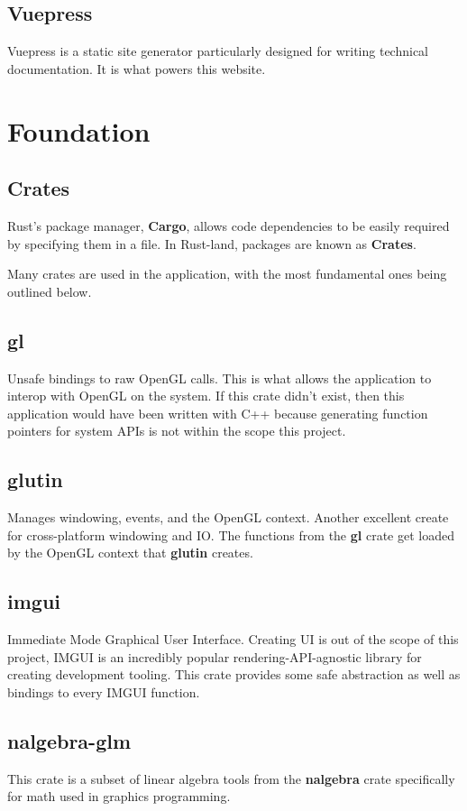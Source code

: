 \begin{multicols}{2}
  \subsection{Vuepress}
  Vuepress is a static site generator particularly designed for writing technical documentation. It is what powers this website.

  \section{Foundation}

  \subsection{Crates}
  Rust's package manager, \textbf{Cargo}, allows code dependencies to be easily required by specifying them in a  file.
  In Rust-land, packages are known as \textbf{Crates}.

  Many crates are used in the application, with the most fundamental ones being outlined below.

  \subsection{gl}
  Unsafe bindings to raw OpenGL calls.
  This is what allows the application to interop with OpenGL on the system.
  If this crate didn't exist, then this application would have been written with C++ because generating function pointers for system APIs is not within the scope this project.

  \subsection{glutin}
  Manages windowing, events, and the OpenGL context.
  Another excellent create for cross-platform windowing and IO\@.
  The functions from the \textbf{gl} crate get loaded by the OpenGL context that \textbf{glutin} creates.

  \subsection{imgui}
  Immediate Mode Graphical User Interface.
  Creating UI is out of the scope of this project, IMGUI is an incredibly popular rendering-API-agnostic library for creating development tooling.
  This crate provides some safe abstraction as well as bindings to every IMGUI function.

  \subsection{nalgebra-glm}
  This crate is a subset of linear algebra tools from the \textbf{nalgebra} crate specifically for math used in graphics programming.


\end{multicols}
